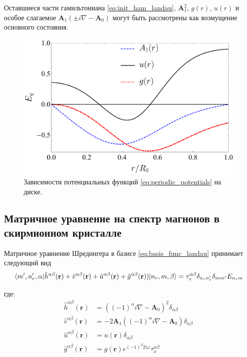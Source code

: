 \documentclass[a4paper,article,14pt]{extarticle}
\begin{document}
Оставшиеся части гамильтониана \eqref{eq:init_ham_landau}, $\mathbf{A}_1^2$, $g(r)$, $u(r)$ и особое слагаемое 
$\mathbf{A}_1  (\pm i \nabla - \mathbf{A}_0 )$ могут быть рассмотрены как возмущение основного состояния.


\begin{figure}[ht]
\centering	
\includegraphics[width=0.9\columnwidth]{images/potentials_h.pdf}
\caption{Зависимости потенциальных функций \eqref{eq:periodic_potentials} на диске.}
\label{fig:potentials_h}
\end{figure}


\subsection{Матричное уравнение на спектр магнонов в скирмионном кристалле}

Матричное уравнение Шредингера в базисе \eqref{eq:basis_func_landau} принимает следующий вид
\begin{equation}
\label{eq:shred_final}
\mel{m', n'_r, \alpha}{\hat h^{\alpha \beta}(\mathbf{r}) + \hat v^{\alpha \beta}(\mathbf{r}) + \hat u^{\alpha \beta}(\mathbf{r}) + \hat g^{\alpha \beta} (\mathbf{r})) }{n_r,m, \beta} = {\tau_z^{\alpha \beta} \delta_{n_r n'_r} \delta_{m m'} E_{n_r m} }
\end{equation}

\noindent где:
\begin{equation}
\label{eq:definitions}
\begin{aligned}
\hat h^{\alpha \beta}(\mathbf{r})   &= \left( (-1)^\alpha i \nabla - \mathbf{A}_0 \right) ^ 2 \delta_{\alpha \beta} \\
\hat v^{\alpha \beta}(\mathbf{r})   &= - 2 \mathbf{A}_1 \left( (-1)^{\alpha} i \nabla - \mathbf{A}_0 \right) \delta_{\alpha \beta} \\
\hat u^{\alpha \beta}(\mathbf{r})   &= u(\mathbf{r})  \delta_{\alpha \beta}\\
\hat g^{\alpha \beta} (\mathbf{r}) &=   g(\mathbf{r})  e^{ (-1)^{\beta} 2  i   \varphi} \tau^{\alpha \beta}_x 
\end{aligned}
\end{equation}
\end{document}
